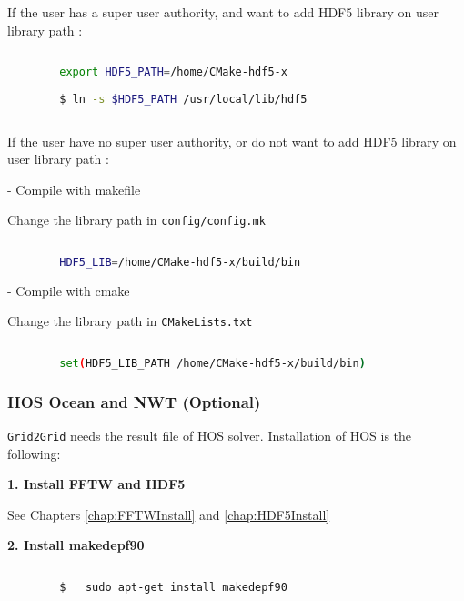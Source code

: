 		If the user has a super user authority, and want to add HDF5 library on user library path :
		
		\begin{lstlisting}[language=bash]
		
		export HDF5_PATH=/home/CMake-hdf5-x
		
		$ ln -s $HDF5_PATH /usr/local/lib/hdf5
		
		\end{lstlisting}
		
		
		If the user have no super user authority, or do not want to add HDF5 library on user library path :
		
		\vspace{0.5em}
		- Compile with makefile
		
		Change the library path in \texttt{config/config.mk}
		
		\begin{lstlisting}[language=bash]
		
		HDF5_LIB=/home/CMake-hdf5-x/build/bin
		\end{lstlisting}
		
		\vspace{0.5em}
		- Compile with cmake		
		
		Change the library path in \texttt{CMakeLists.txt}		
		
		\begin{lstlisting}[language=bash]
		
		set(HDF5_LIB_PATH /home/CMake-hdf5-x/build/bin)
		\end{lstlisting}		
		
		
		\pagebreak
		\subsubsection{HOS Ocean and NWT (Optional)}
		
		\texttt{Grid2Grid} needs the result file of HOS solver. Installation of HOS is the following: 
		
		\vspace{1em}
		\textbf{1. Install FFTW and HDF5}
		
		See Chapters \ref{chap:FFTWInstall} and \ref{chap:HDF5Install}
		
		\vspace{1em}
		\textbf{2. Install makedepf90}
		
		\begin{lstlisting}[language=bash]		
		
		$	sudo apt-get install makedepf90		
		\end{lstlisting}
		
